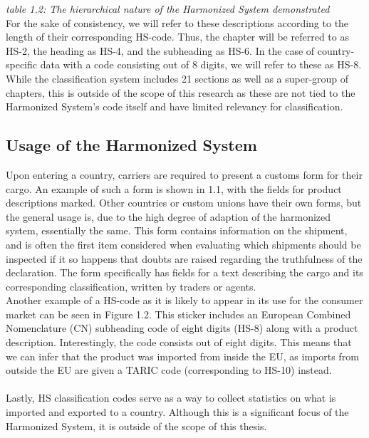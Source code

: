 \begin{center}
    
\end{center}
{\textit{table 1.2: The hierarchical nature of the Harmonized System demonstrated}} \\

For the sake of consistency, we will refer to these descriptions according to the length of their corresponding HS-code. Thus, the chapter will be referred to as HS-2, the heading as HS-4, and the subheading as HS-6. In the case of country-specific data with a code consisting out of 8 digits, we will refer to these as HS-8. While the classification system includes 21 sections as well as a super-group of chapters, this is outside of the scope of this research as these are not tied to the Harmonized System’s code itself and have limited relevancy for classification.

\subsection{Usage of the Harmonized System}
Upon entering a country, carriers are required to present a customs form for their cargo. An example of such a form is shown in 1.1, with the fields for product descriptions marked. Other countries or custom unions have their own forms, but the general usage is, due to the high degree of adaption of the harmonized system, essentially the same. This form contains information on the shipment, and is often the first item considered when evaluating which shipments should be inspected if it so happens that doubts are raised regarding the truthfulness of the declaration. The form specifically has fields for a text describing the cargo and its corresponding classification, written by traders or agents.
\\
Another example of a HS-code as it is likely to appear in its use for the consumer market can be seen in Figure 1.2. This sticker includes an European Combined Nomenclature (CN) subheading code of eight digits (HS-8) along with a product description. Interestingly, the code consists out of eight digits. This means that we can infer that the product was imported from inside the EU, as imports from outside the EU are given a TARIC code (corresponding to HS-10) instead.\\
\\
Lastly, HS classification codes serve as a way to collect statistics on what is imported and exported to a country. Although this is a significant focus of the Harmonized System, it is outside of the scope of this thesis.

